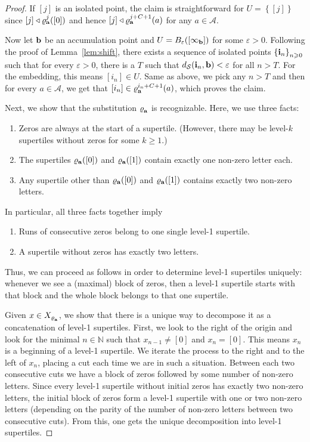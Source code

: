 \begin{proof}
If $[j]$ is an isolated point, the claim  is straightforward for $U=\left\{[j]\right\}$ since $[j]\triangleleft\varrho^{j}_{\bf{a}}([0])$ and hence $[j]\triangleleft\varrho^{j+C+1}_{\bf{a}}(a)$ for any $a\in \mathcal{A}$.

Now let $\bf{b}$ be an accumulation point and $U=B_{\varepsilon}([\infty_{\bf{b}}])$ for some $\varepsilon>0$. Following the proof of Lemma~\ref{lem:shift}, there exists a sequence of isolated points $\left\{{\bf{i}}_{n}\right\}_{n\geqslant 0}$ such that for every $\varepsilon>0$, there is a $T$ such that $d_\mathcal S({\bf{i}}_n,\bf{b})<\varepsilon$ for all $n>T$. For the embedding, this means $[i_n]\in U$. Same as above, we pick any $n>T$ and then for every $a\in\mathcal{A}$, we get that $[i_n]\in\varrho_{\bf{a}}^{i_n+C+1}(a)$, which proves the claim.


Next, we show that the substitution $\varrho^{ }_{\bf{a}}$ is recognizable. Here, we use three facts: 
\begin{enumerate}
        \item Zeros are always at the start of a supertile. (However, there may be level-$k$ supertiles without zeros for some $k\geq 1$.)
        \item  The supertiles $\varrho_{\bf{a}}([0])$ and $\varrho_{\bf{a}}([1])$ contain exactly one non-zero letter each.
        \item  Any supertile other than $\varrho_{\bf{a}}([0])$ and $\varrho_{\bf{a}}([1])$  contains exactly two non-zero letters.
\end{enumerate}
  In particular, all three facts together imply 
 \begin{enumerate}
     \item Runs of consecutive zeros belong to one single level-1 supertile.
     \item A supertile without zeros has exactly two letters.
 \end{enumerate}
  Thus, we can proceed as follows in order to determine level-1 supertiles uniquely:
whenever we see a (maximal) block of zeros, then a level-1 supertile starts with that block and the whole block belongs to that one supertile. 
%

Given $x\in X_{\varrho^{ }_{\bf a}}$, we show that there is a unique way to decompose it as a  concatenation of level-1 supertiles. First, we look to the right of the origin and look for the minimal $n\in\mathbb{N}$ such that $x_{n-1}\neq [0]$ and $x_n=[0]$. This means $x_n$ is a beginning of a level-1 supertile. We iterate the process to the right and to the left of $x_n$, placing a cut each time we are in such a situation. Between each two consecutive cuts we have a block of zeros followed by some number of non-zero letters. Since every level-1 supertile without initial zeros has exactly two non-zero letters, the initial block of zeros form a level-1 supertile with one or two non-zero letters (depending on the parity of the number of non-zero letters between two consecutive cuts). From this, one gets the unique decomposition into level-1 supertiles. 


\end{proof}
